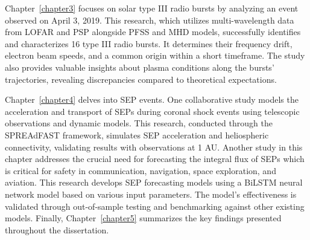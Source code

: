 Chapter~\ref{chapter3} focuses on solar type III radio bursts by analyzing an event observed on April 3, 2019. This research, which utilizes multi-wavelength data from LOFAR and PSP alongside PFSS and MHD models, successfully identifies and characterizes 16 type III radio bursts. It determines their frequency drift, electron beam speeds, and a common origin within a short timeframe. The study also provides valuable insights about plasma conditions along the bursts' trajectories, revealing discrepancies compared to theoretical expectations.

Chapter~\ref{chapter4} delves into SEP events. One collaborative study models the acceleration and transport of SEPs during coronal shock events using telescopic observations and dynamic models. This research, conducted through the SPREAdFAST framework, simulates SEP acceleration and heliospheric connectivity, validating results with observations at 1 AU. Another study in this chapter addresses the crucial need for forecasting the integral flux of SEPs which is critical for safety in communication, navigation, space exploration, and aviation. This research develops SEP forecasting models using a BiLSTM neural network model based on various input parameters. The model's effectiveness is validated through out-of-sample testing and benchmarking against other existing models. Finally, Chapter~\ref{chapter5} summarizes the key findings presented throughout the dissertation.

